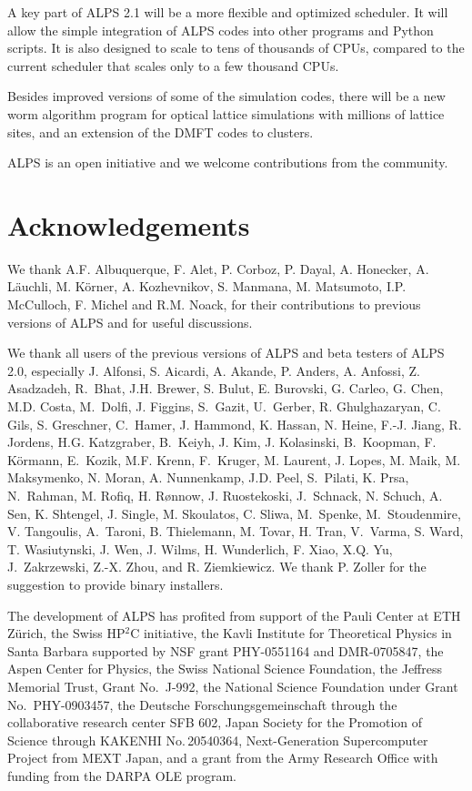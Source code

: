 \documentclass[12pt]{iopart}
\begin{document}
A key part of ALPS 2.1 will be a more flexible and optimized scheduler. It will allow  the simple integration of ALPS codes into other programs and Python scripts. It is also designed to scale to tens of thousands of CPUs, compared to the current scheduler that scales only to a few thousand CPUs. 

Besides improved versions of some of the simulation codes, there will be a new worm algorithm program for optical lattice simulations with millions of lattice sites, and an extension of the DMFT codes to clusters.

ALPS is an open initiative and we welcome contributions from the community.


\section{Acknowledgements}

We thank A.F. Albuquerque, F. Alet, P. Corboz, P. Dayal, A. Honecker, A. L\"auchli, M. K\"orner,  A. Kozhevnikov, S. Manmana, M. Matsumoto, I.P. McCulloch, F. Michel and R.M. Noack, for their contributions to previous versions of ALPS and  for useful discussions. 

We thank all users of the previous versions of ALPS and beta testers of ALPS 2.0, especially J. Alfonsi, S. Aicardi, A. Akande, P. Anders, A. Anfossi, Z. Asadzadeh, R.~Bhat, J.H. Brewer, S. Bulut, E. Burovski, G. Carleo, G. Chen, M.D. Costa, M.~Dolfi, J. Figgins, S.~Gazit, U.~Gerber, R. Ghulghazaryan, C. Gils, S. Greschner, C.~Hamer, J. Hammond, K. Hassan, N. Heine, F.-J. Jiang, R. Jordens, H.G. Katzgraber, B.~Keiyh, J. Kim, J. Kolasinski, B.~Koopman, F. K\"ormann, E.~Kozik, M.F. Krenn, F.~Kruger, M. Laurent, J. Lopes, M. Maik, M. Maksymenko, N. Moran, A. Nunnenkamp, J.D. Peel, S.~Pilati, K. Prsa, N.~Rahman, M. Rofiq, H. R\o nnow, J. Ruostekoski, J.~Schnack, N. Schuch, A. Sen, K. Shtengel, J. Single, M. Skoulatos, C. Sliwa, M.~Spenke, M.~Stoudenmire, V. Tangoulis, A.~Taroni, B. Thielemann, M. Tovar, H. Tran, V.~Varma, S. Ward, T. Wasiutynski, J. Wen, J. Wilms, H. Wunderlich, F. Xiao, X.Q. Yu, J.~Zakrzewski, Z.-X. Zhou, and R. Ziemkiewicz. We thank P. Zoller for the suggestion to provide binary installers. 

The development of ALPS has profited from support of the Pauli Center at ETH Z\"urich, the Swiss HP$^2$C initiative, the Kavli Institute for Theoretical Physics in Santa Barbara supported by NSF grant  PHY-0551164 and DMR-0705847, the Aspen Center for Physics, the Swiss National Science Foundation, the Jeffress Memorial Trust, Grant No.~J-992, the National Science Foundation under Grant No.~PHY-0903457, the Deutsche Forschungsgemeinschaft through the collaborative research center SFB 602, Japan Society for the Promotion of Science through KAKENHI No.\,20540364, Next-Generation Supercomputer Project from MEXT Japan, and a grant from the Army Research Office with funding from the DARPA OLE program.
\end{document}
